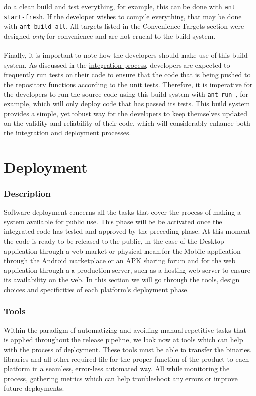\documentclass[12pt]{report}
\begin{document}
do a clean build and test everything, for example, this can be done with \texttt{ant start-fresh}.
If the developer wishes to compile everything, that may be done with \texttt{ant build-all}. All
targets listed in the Convenience Targets section were designed \textit{only} for convenience and
are not crucial to the build system.\\\\
Finally, it is important to note how the developers should make use of this build system. As
discussed in the \hyperref[s:integrationprocessrationale]{integration process}, developers are
expected to frequently run tests on their code to ensure that the code that is being pushed to the
repository functions according to the unit tests. Therefore, it is imperative for the developers to
run the source code using this build system with \texttt{ant run-}, for example, which will only
deploy code that has passed its tests. This build system provides a simple, yet robust way for the
developers to keep themselves updated on the validity and reliability of their code, which will
considerably enhance both the integration and deployment processes.
\part{Deployment}
\section{Description}
Software deployment concerns all the tasks that cover the process of making a system available for public use.
This phase will be be activated once the integrated code has tested and approved by the preceding
phase. At this moment the code is ready to be released to the public, In the case of the Desktop
application through a web market or physical mean,for the Mobile application through the Android
marketplace or an APK sharing forum and for the web application through a a production server, such
as a hosting web server to ensure its availability on the web. In this section we will go through
the tools, design choices and specificities of each platform's deployment phase.

\section{Tools}
Within the paradigm of automatizing and avoiding manual repetitive tasks that is applied throughout the release pipeline, we look now at tools which can help with the process of deployment. These tools must be able to transfer the binaries, libraries and all other required file for the proper function of the product to each platform in a seamless, error-less automated way. All while monitoring the process, gathering metrics which can help troubleshoot any errors or improve future deployments.
\end{document}
